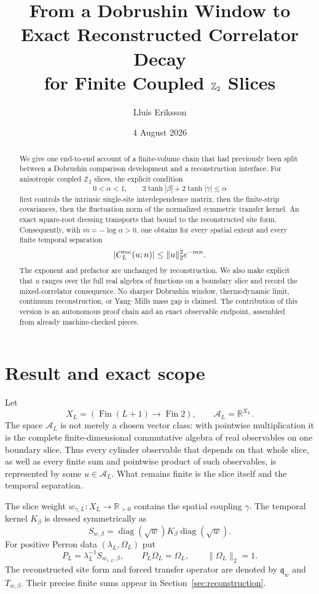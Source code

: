 \documentclass[11pt]{article}
\title{From a Dobrushin Window to Exact Reconstructed Correlator Decay\\
for Finite Coupled $\Z_2$ Slices}
\author{Llu\'is Eriksson}
\date{4 August 2026}
\theoremstyle{definition}
\theoremstyle{remark}
\newcommand{\R}{\mathbb{R}}
\newcommand{\Z}{\mathbb{Z}}
\newcommand{\cA}{\mathcal{A}}
\newcommand{\diag}{\operatorname{diag}}
\begin{document}
\maketitle

\begin{abstract}
We give one end-to-end account of a finite-volume chain that had previously
been split between a Dobrushin comparison development and a reconstruction
interface.  For anisotropic coupled $\Z_2$ slices, the explicit condition
\[
  0<\alpha<1,
  \qquad 2\tanh|\beta|+2\tanh|\gamma|\leq\alpha
\]
first controls the intrinsic single-site interdependence matrix, then the
finite-strip covariances, then the fluctuation norm of the normalized symmetric
transfer kernel.  An exact square-root dressing transports that bound to the
reconstructed site form.  Consequently, with $m=-\log\alpha>0$, one obtains
for every spatial extent and every finite temporal separation
\[
  |C^{\rm rec}_L(u;n)|\leq \|u\|_2^2 e^{-mn}.
\]
The exponent and prefactor are unchanged by reconstruction.  We also make
explicit that $u$ ranges over the full real algebra of functions on a boundary
slice and record the mixed-correlator consequence.  No sharper Dobrushin
window, thermodynamic limit, continuum reconstruction, or Yang--Mills mass gap
is claimed.  The contribution of this version is an autonomous proof chain and
an exact observable endpoint, assembled from already machine-checked pieces.
\end{abstract}

\section{Result and exact scope}

Let
\[
  X_L=(\operatorname{Fin}(L+1)\to\operatorname{Fin}2),
  \qquad \cA_L=\R^{X_L}.
\]
The space $\cA_L$ is not merely a chosen vector class: with pointwise
multiplication it is the complete finite-dimensional commutative algebra of
real observables on one boundary slice.  Thus every cylinder observable that
depends on that whole slice, as well as every finite sum and pointwise product
of such observables, is represented by some $u\in\cA_L$.  What remains finite
is the slice itself and the temporal separation.

The slice weight $w_{\gamma,L}:X_L\to\R_{>0}$ contains the spatial coupling
$\gamma$.  The temporal kernel $K_\beta$ is dressed symmetrically as
\[
  S_{w,\beta}=\diag(\sqrt w)K_\beta\diag(\sqrt w).
\]
For positive Perron data $(\lambda_L,\Omega_L)$ put
\[
  P_L=\lambda_L^{-1}S_{w_{\gamma,L},\beta},
  \qquad P_L\Omega_L=\Omega_L,
  \qquad \|\Omega_L\|_2=1.
\]
The reconstructed site form and forced transfer operator are denoted by
$\mathfrak q_w$ and $T_{w,\beta}$.  Their precise finite sums appear in
Section~\ref{sec:reconstruction}.
\end{document}
